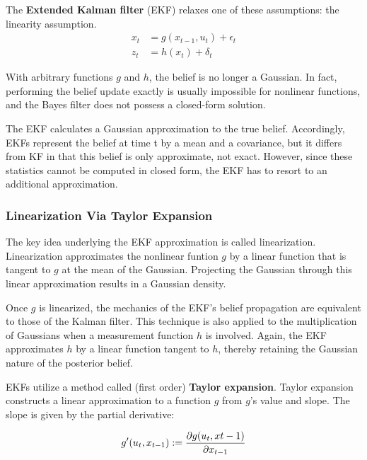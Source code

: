 \vspace{2mm}

The \textbf{Extended Kalman filter} (EKF) relaxes one of these assumptions: the linearity assumption.
\begin{align}
  x_t &= g(x_{t-1}, u_t) + \epsilon_t \\
  z_t &= h(x_t) + \delta_t
\end{align}

With arbitrary functions $g$ and $h$, the belief is no longer a Gaussian.
In fact, performing the belief update exactly is usually impossible for nonlinear functions, and the Bayes filter does not possess a closed-form solution.

The EKF calculates a Gaussian approximation to the true belief.
Accordingly, EKFs represent the belief at time t by a mean and a covariance, but it differs from KF in that this belief is only approximate, not exact.
However, since these statistics cannot be computed in closed form, the EKF has to resort to an additional approximation.

\subsubsection{Linearization Via Taylor Expansion}

The key idea underlying the EKF approximation is called linearization.
Linearization approximates the nonlinear funtion $g$ by a linear function that is tangent to $g$ at the mean of the Gaussian.
Projecting the Gaussian through this linear approximation results in a Gaussian density.

\vspace{2mm}

Once $g$ is linearized, the mechanics of the EKF's belief propagation are equivalent to those of the Kalman filter.
This technique is also applied to the multiplication of Gaussians when a measurement function $h$ is involved.
Again, the EKF approximates $h$ by a linear function tangent to $h$, thereby retaining the Gaussian nature of the posterior belief.

\newpage
EKFs utilize a method called (first order) \textbf{Taylor expansion}.
Taylor expansion constructs a linear approximation to a function $g$ from $g$'s value and slope.
The slope is given by the partial derivative:

\begin{equation}
  g'(u_t, x_{t-1}) := \frac{\partial{g(u_t, x{t-1})}}{\partial{x_{t-1}}} \\
\end{equation}

